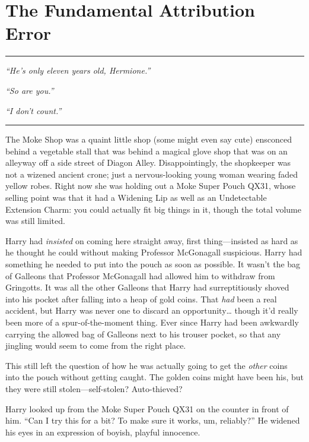 \chapter{The Fundamental Attribution
Error}\label{the-fundamental-attribution-error}

\begin{center}\rule{3in}{0.4pt}\end{center}

\emph{``He's only eleven years old, Hermione.''}

\emph{``So are you.''}

\emph{``I don't count.''}

\begin{center}\rule{3in}{0.4pt}\end{center}

The Moke Shop was a quaint little shop (some might even say cute)
ensconced behind a vegetable stall that was behind a magical glove shop
that was on an alleyway off a side street of Diagon Alley.
Disappointingly, the shopkeeper was not a wizened ancient crone; just a
nervous-looking young woman wearing faded yellow robes. Right now she
was holding out a Moke Super Pouch QX31, whose selling point was that it
had a Widening Lip as well as an Undetectable Extension Charm: you could
actually fit big things in it, though the total volume was still
limited.

Harry had \emph{insisted} on coming here straight away, first
thing---insisted as hard as he thought he could without making Professor
McGonagall suspicious. Harry had something he needed to put into the
pouch as soon as possible. It wasn't the bag of Galleons that Professor
McGonagall had allowed him to withdraw from Gringotts. It was all the
other Galleons that Harry had surreptitiously shoved into his pocket
after falling into a heap of gold coins. That \emph{had} been a real
accident, but Harry was never one to discard an opportunity\ldots{}
though it'd really been more of a spur-of-the-moment thing. Ever since
Harry had been awkwardly carrying the allowed bag of Galleons next to
his trouser pocket, so that any jingling would seem to come from the
right place.

This still left the question of how he was actually going to get the
\emph{other} coins into the pouch without getting caught. The golden
coins might have been his, but they were still stolen---self-stolen?
Auto-thieved?

Harry looked up from the Moke Super Pouch QX31 on the counter in front
of him. ``Can I try this for a bit? To make sure it works, um,
reliably?'' He widened his eyes in an expression of boyish, playful
innocence.

